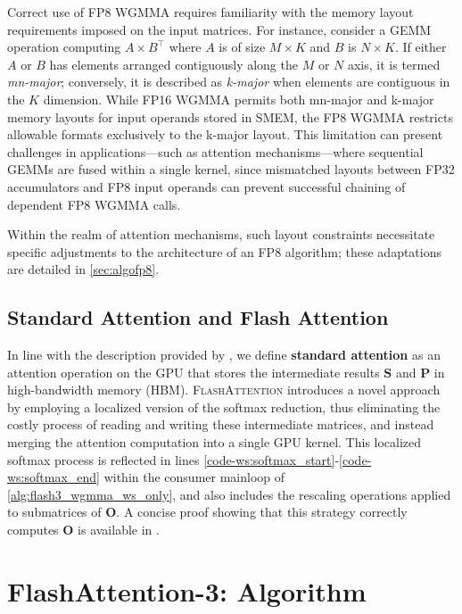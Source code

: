 \begin{enumerate}
Correct use of FP8 WGMMA requires familiarity with the memory layout requirements imposed on the input matrices. For instance, consider a GEMM operation computing $A \times B^{\top}$ where $A$ is of size $M \times K$ and $B$ is $N \times K$. If either $A$ or $B$ has elements arranged contiguously along the $M$ or $N$ axis, it is termed \emph{mn-major}; conversely, it is described as \emph{k-major} when elements are contiguous in the $K$ dimension. While FP16 WGMMA permits both mn-major and k-major memory layouts for input operands stored in SMEM, the FP8 WGMMA restricts allowable formats exclusively to the k-major layout. This limitation can present challenges in applications—such as attention mechanisms—where sequential GEMMs are fused within a single kernel, since mismatched layouts between FP32 accumulators and FP8 input operands can prevent successful chaining of dependent FP8 WGMMA calls.

Within the realm of attention mechanisms, such layout constraints necessitate specific adjustments to the architecture of an FP8 algorithm; these adaptations are detailed in \cref{sec:algofp8}.

\subsection{Standard Attention and Flash Attention} In line with the description provided by \citet{dao2022flashattention}, we define \textbf{standard attention} as an attention operation on the GPU that stores the intermediate results $\mathbf{S}$ and $\mathbf{P}$ in high-bandwidth memory (HBM). \textsc{FlashAttention} introduces a novel approach by employing a localized version of the softmax reduction, thus eliminating the costly process of reading and writing these intermediate matrices, and instead merging the attention computation into a single GPU kernel. This localized softmax process is reflected in lines \ref{code-ws:softmax_start}-\ref{code-ws:softmax_end} within the consumer mainloop of \cref{alg:flash3_wgmma_ws_only}, and also includes the rescaling operations applied to submatrices of $\mathbf{O}$. A concise proof showing that this strategy correctly computes $\mathbf{O}$ is available in \cite[\S 2.3.1]{dao2023flashattention2}.

\section{FlashAttention-3: Algorithm}
\label{sec:algo}


\end{enumerate}
